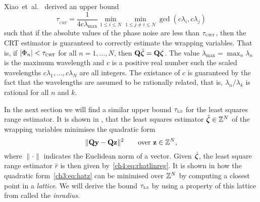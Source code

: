 Xiao~et~al.~\cite{Xiao_multistage_crt_2014} derived an upper bound 
\begin{equation}\label{eq:crt-upper-bound}
\tau_{_{CRT}} =  \frac{1}{4c \lambda_{\max}}\min_{1\leq i \leq N}  \min_{1\leq j \neq i \leq N} \gcd (c\lambda_i, c\lambda_j)
\end{equation} 
such that if the absolute values of the phase noise are less than $\tau_{\text{\tiny{CRT}}}$, then the CRT estimator is guaranteed to correctly estimate the wrapping variables.  That is, if  $\left\vert \Phi_n \right\vert < \tau_{\text{\tiny{CRT}}}$ for all $n = 1, \dots, N$, then $\mathbf{Q} \hat{\boldsymbol{\zeta}} = \mathbf{Q}\boldsymbol{\zeta}$.  The value $\lambda_{\text{max}} = \max_n \lambda_n$ is the maximum wavelength and $c$ is a positive real number such the scaled wavelengths $c \lambda_1, \dots, c \lambda_N$ are all integers.  The existance of $c$ is guaranteed by the fact that the wavelengths are assumed to be rationally related, that is, $\lambda_n/\lambda_k$ is rational for all $n$ and $k$.

In the next section we will find a similar upper bound $\tau_{\text{\tiny{LS}}}$ for the least squares range estimator.  It is shown in , that the least squares estimator $\hat{\boldsymbol{\zeta}} \in {\mathbb Z}^N$ of the wrapping variables minimises the quadratic form
\begin{equation}\label{eq:hatz}
\| \mathbf{Q}\mathbf{y} - \mathbf{Q}\mathbf{z} \|^2 \qquad \text{over $\mathbf{z} \in {\mathbb Z}^N$},
\end{equation}
where $\|\cdot\|$ indicates the Euclidean norm of a vector.  Given $\hat{\boldsymbol{\zeta}}$, the least square range estimator $\hat{r}$ is then given by~\ref{ch4:eq:rhatlinreg}.  It is shown in  how the quadratic form~\ref{ch3:eq:hatz} can be minimised over ${\mathbb Z}^N$ by computing a closest point in a \emph{lattice}.  We will derive the bound $\tau_{\text{\tiny{LS}}}$ by using a property of this lattice from  called the \emph{inradius}. 


